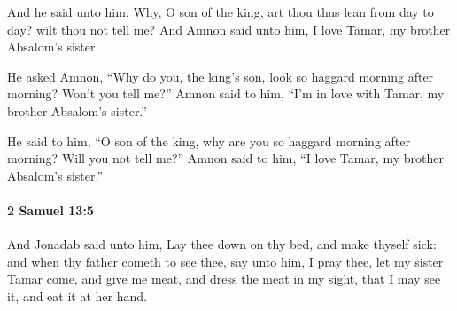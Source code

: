 			\begin{versebox}
					\item[BHS] 
					\item[ASV] And he said unto him, Why, O son of the king, art thou thus lean from day to day? wilt thou not tell me? And Amnon said unto him, I love Tamar, my brother Absalom's sister.
					\item[NIV] He asked Amnon, “Why do you, the king’s son, look so haggard morning after morning? Won’t you tell me?” Amnon said to him, “I’m in love with Tamar, my brother Absalom’s sister.”
					\item[NRSV] He said to him, “O son of the king, why are you so haggard morning after morning? Will you not tell me?” Amnon said to him, “I love Tamar, my brother Absalom’s sister.”
			\end{versebox}

		\paragraph{2 Samuel 13:5} %
			\label{2SAMUEL-13-5}

			And Jonadab said unto him, Lay thee down on thy bed, and make thyself sick: and when thy father cometh to see thee, say unto him, I pray thee, let my sister Tamar come, and give me meat, and dress the meat in my sight, that I may see it, and eat it at her hand.

